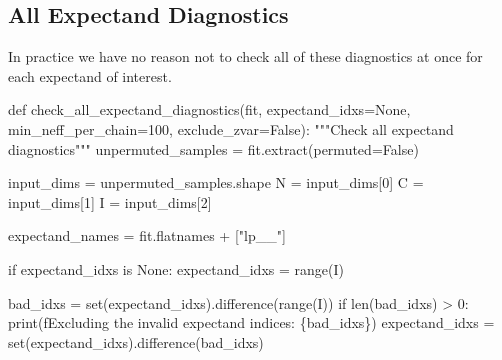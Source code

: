 \documentclass[
  letterpaper,
  DIV=11,
  numbers=noendperiod]{scrartcl}
\newenvironment{Shaded}{\begin{snugshade}}{\end{snugshade}}
\newcommand{\BuiltInTok}[1]{\textcolor[rgb]{0.00,0.23,0.31}{#1}}
\newcommand{\CommentTok}[1]{\textcolor[rgb]{0.37,0.37,0.37}{#1}}
\newcommand{\ControlFlowTok}[1]{\textcolor[rgb]{0.00,0.23,0.31}{#1}}
\newcommand{\DecValTok}[1]{\textcolor[rgb]{0.68,0.00,0.00}{#1}}
\newcommand{\KeywordTok}[1]{\textcolor[rgb]{0.00,0.23,0.31}{#1}}
\newcommand{\NormalTok}[1]{\textcolor[rgb]{0.00,0.23,0.31}{#1}}
\newcommand{\OperatorTok}[1]{\textcolor[rgb]{0.37,0.37,0.37}{#1}}
\newcommand{\SpecialCharTok}[1]{\textcolor[rgb]{0.37,0.37,0.37}{#1}}
\newcommand{\SpecialStringTok}[1]{\textcolor[rgb]{0.13,0.47,0.30}{#1}}
\newcommand{\StringTok}[1]{\textcolor[rgb]{0.13,0.47,0.30}{#1}}
\newcommand{\VariableTok}[1]{\textcolor[rgb]{0.07,0.07,0.07}{#1}}
\begin{document}
\hypertarget{all-expectand-diagnostics}{%
\subsection{All Expectand Diagnostics}\label{all-expectand-diagnostics}}

In practice we have no reason not to check all of these diagnostics at
once for each expectand of interest.

\begin{Shaded}
\begin{Highlighting}[]
\KeywordTok{def}\NormalTok{ check\_all\_expectand\_diagnostics(fit,}
\NormalTok{                                    expectand\_idxs}\OperatorTok{=}\VariableTok{None}\NormalTok{,}
\NormalTok{                                    min\_neff\_per\_chain}\OperatorTok{=}\DecValTok{100}\NormalTok{,}
\NormalTok{                                    exclude\_zvar}\OperatorTok{=}\VariableTok{False}\NormalTok{):}
  \CommentTok{"""Check all expectand diagnostics"""}
\NormalTok{  unpermuted\_samples }\OperatorTok{=}\NormalTok{ fit.extract(permuted}\OperatorTok{=}\VariableTok{False}\NormalTok{)}
  
\NormalTok{  input\_dims }\OperatorTok{=}\NormalTok{ unpermuted\_samples.shape}
\NormalTok{  N }\OperatorTok{=}\NormalTok{ input\_dims[}\DecValTok{0}\NormalTok{]}
\NormalTok{  C }\OperatorTok{=}\NormalTok{ input\_dims[}\DecValTok{1}\NormalTok{]}
\NormalTok{  I }\OperatorTok{=}\NormalTok{ input\_dims[}\DecValTok{2}\NormalTok{]}
  
\NormalTok{  expectand\_names }\OperatorTok{=}\NormalTok{ fit.flatnames }\OperatorTok{+}\NormalTok{ [}\StringTok{"lp\_\_"}\NormalTok{]}
  
  \ControlFlowTok{if}\NormalTok{ expectand\_idxs }\KeywordTok{is} \VariableTok{None}\NormalTok{:}
\NormalTok{    expectand\_idxs }\OperatorTok{=} \BuiltInTok{range}\NormalTok{(I)}
  
\NormalTok{  bad\_idxs }\OperatorTok{=} \BuiltInTok{set}\NormalTok{(expectand\_idxs).difference(}\BuiltInTok{range}\NormalTok{(I))}
  \ControlFlowTok{if} \BuiltInTok{len}\NormalTok{(bad\_idxs) }\OperatorTok{\textgreater{}} \DecValTok{0}\NormalTok{:}
    \BuiltInTok{print}\NormalTok{(}\SpecialStringTok{f\textquotesingle{}Excluding the invalid expectand indices: }\SpecialCharTok{\{}\NormalTok{bad\_idxs}\SpecialCharTok{\}}\SpecialStringTok{\textquotesingle{}}\NormalTok{)}
\NormalTok{    expectand\_idxs }\OperatorTok{=} \BuiltInTok{set}\NormalTok{(expectand\_idxs).difference(bad\_idxs)}


\end{Highlighting}
\end{Shaded}
\end{document}
